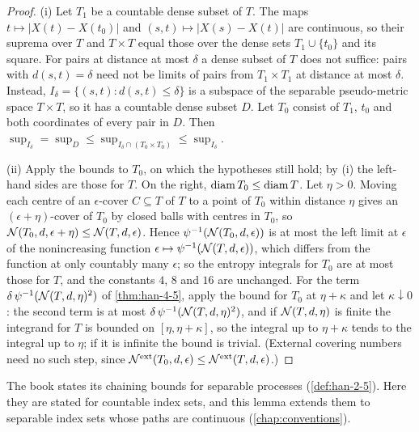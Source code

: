 \begin{proof}
  (i) Let $T_1$ be a countable dense subset of $T$. The maps $t\mapsto|X(t)-X(t_0)|$ and $(s,t)\mapsto|X(s)-X(t)|$ are continuous, so their suprema over $T$ and $T\times T$ equal those over the dense sets $T_1\cup\{t_0\}$ and its square. For pairs at distance at most $\delta$ a dense subset of $T$ does not suffice: pairs with $d(s,t)=\delta$ need not be limits of pairs from $T_1\times T_1$ at distance at most $\delta$. Instead, $I_\delta=\{(s,t):d(s,t)\le\delta\}$ is a subspace of the separable pseudo-metric space $T\times T$, so it has a countable dense subset $D$. Let $T_0$ consist of $T_1$, $t_0$ and both coordinates of every pair in $D$. Then $\sup_{I_\delta}=\sup_D\le\sup_{I_\delta\cap(T_0\times T_0)}\le\sup_{I_\delta}$.

  (ii) Apply the bounds to $T_0$, on which the hypotheses still hold; by (i) the left-hand sides are those for $T$. On the right, $\operatorname{diam} T_0\le\operatorname{diam} T$. Let $\eta>0$. Moving each centre of an $\epsilon$-cover $C\subseteq T$ of $T$ to a point of $T_0$ within distance $\eta$ gives an $(\epsilon+\eta)$-cover of $T_0$ by closed balls with centres in $T_0$, so $\mathcal{N}(T_0,d,\epsilon+\eta)\le\mathcal{N}(T,d,\epsilon)$. Hence $\psi^{-1}(\mathcal{N}(T_0,d,\epsilon))$ is at most the left limit at $\epsilon$ of the nonincreasing function $\epsilon\mapsto\psi^{-1}(\mathcal{N}(T,d,\epsilon))$, which differs from the function at only countably many $\epsilon$; so the entropy integrals for $T_0$ are at most those for $T$, and the constants $4$, $8$ and $16$ are unchanged. For the term $\delta\,\psi^{-1}(\mathcal{N}(T,d,\eta)^2)$ of \cref{thm:han-4-5}, apply the bound for $T_0$ at $\eta+\kappa$ and let $\kappa\downarrow0$: the second term is at most $\delta\,\psi^{-1}(\mathcal{N}(T,d,\eta)^2)$, and if $\mathcal{N}(T,d,\eta)$ is finite the integrand for $T$ is bounded on $[\eta,\eta+\kappa]$, so the integral up to $\eta+\kappa$ tends to the integral up to $\eta$; if it is infinite the bound is trivial. (External covering numbers need no such step, since $\mathcal{N}^{\mathrm{ext}}(T_0,d,\epsilon)\le\mathcal{N}^{\mathrm{ext}}(T,d,\epsilon)$.)
\end{proof}
\begin{remark}
  The book states its chaining bounds for separable processes (\cref{def:han-2-5}). Here they are stated for countable index sets, and this lemma extends them to separable index sets whose paths are continuous (\cref{chap:conventions}).
\end{remark}
